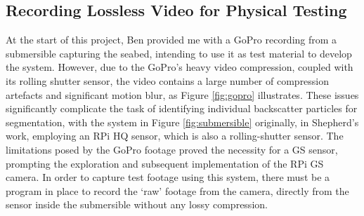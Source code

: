 \subsection{Recording Lossless Video for Physical Testing}
\label{designrec}

At the start of this project, Ben provided me with a GoPro recording from a submersible capturing the seabed, intending to use it as test material to develop the system. However, due to the GoPro's heavy video compression, coupled with its rolling shutter sensor, the video contains a large number of compression artefacts and significant motion blur, as Figure \ref{fig:gopro} illustrates. These issues significantly complicate the task of identifying individual backscatter particles for segmentation, with the system in Figure \ref{fig:submersible} originally, in Shepherd's work, employing an RPi HQ sensor, which is also a rolling-shutter sensor. The limitations posed by the GoPro footage proved the necessity for a GS sensor, prompting the exploration and subsequent implementation of the RPi GS camera. In order to capture test footage using this system, there must be a program in place to record the `raw' footage from the camera, directly from the sensor inside the submersible without any lossy compression.

